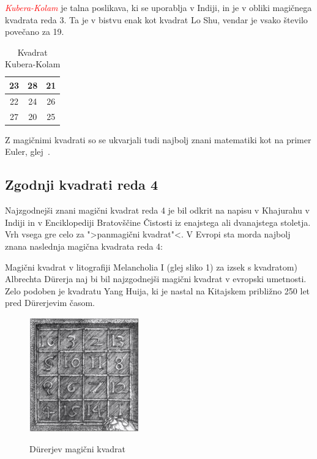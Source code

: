 \documentclass[a4paper,12pt]{article}
\begin{document}
\textcolor{red}{\emph{Kubera-Kolam}} je talna poslikava, ki se uporablja v Indiji, in je v
obliki magičnega kvadrata reda 3. Ta je v bistvu enak kot kvadrat
Lo Shu, vendar je vsako število povečano za 19.

\begin{table}[h]
   \centering
   \large
   \caption{Kvadrat Kubera-Kolam}
   \begin{tabular}{|c|c|c|}
      \hline
         23 & 28 & 21 \\\hline
         22 & 24 & 26 \\\hline
         27 & 20 & 25 \\\hline
\end{tabular}
\label{table:kubera}
\end{table}

Z magičnimi kvadrati so se ukvarjali tudi najbolj znani matematiki kot na
primer Euler, glej~\cite{euler}. 

\subsection{Zgodnji kvadrati reda 4}

Najzgodnejši znani magični kvadrat reda 4 je bil odkrit na napisu
v Khajurahu v Indiji in v Enciklopediji Bratovščine Čistosti iz enajstega
ali dvanajstega stoletja. Vrh vsega gre celo za ">panmagični kvadrat"<.
V Evropi sta morda najbolj znana naslednja magična kvadrata reda 4:

Magični kvadrat v litografiji Melancholia I (glej sliko 1)
za izsek s kvadratom) Albrechta Dürerja naj bi bil najzgodnejši magični kvadrat
v evropski umetnosti. Zelo podoben je kvadratu Yang Huija, ki je nastal na Kitajskem
približno 250 let pred Dürerjevim časom. 

\begin{figure}[!ht]
   \centering
   \caption{Dürerjev magični kvadrat}
   \includegraphics[scale=1.3]{durer.png}
   \label{fig:durer}   
\end{figure}
\end{document}
